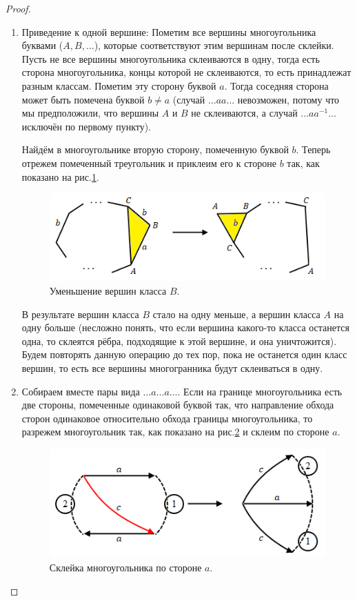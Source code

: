 \begin{proof}
\begin{enumerate}
        \item Приведение к одной вершине: 
        Пометим все вершины многоугольника буквами ($A,B, \dots$), которые соответствуют этим вершинам после склейки. Пусть не все вершины многоугольника склеиваются в одну, тогда есть сторона многоугольника, концы которой не склеиваются, то есть принадлежат разным классам. Пометим эту сторону буквой $a$. Тогда соседняя сторона может быть помечена буквой $b \neq a$ (случай $\dots aa \dots$ невозможен, потому что мы предположили, что вершины $A$ и $B$ не склеиваются, а случай $\dots aa^{-1} \dots$ исключён по первому пункту).

        Найдём в многоугольнике вторую сторону, помеченную буквой $b$. Теперь отрежем помеченный треугольник и приклеим его к стороне $b$ так, как показано на рис.\ref{fig:c10.5}.

        \begin{figure}[ht]
            \centering
            \includegraphics[scale=0.7]{images/c10.5.png}
            \caption{Уменьшение вершин класса $B$.}
            \label{fig:c10.5}
        \end{figure}

        В результате вершин класса $B$ стало на одну меньше, а вершин класса $A$ на одну больше (несложно понять, что если вершина какого-то класса останется одна, то склеятся рёбра, подходящие к этой вершине, и она уничтожится). Будем повторять данную операцию до тех пор, пока не останется один класс вершин, то есть все вершины многогранника будут склеиваться в одну.

        \item Собираем вместе пары вида $\dots a \dots a \dots$. Если на границе многоугольника есть две стороны, помеченные одинаковой буквой так, что направление обхода сторон одинаковое относительно обхода границы многоугольника, то разрежем многоугольник так, как показано на рис.\ref{fig:c10.6} и склеим по стороне $a$.
        
        \begin{figure}[ht]
            \centering
            \includegraphics[scale=0.7]{images/c10.6.png}
            \caption{Склейка многоугольника по стороне $a$.}
            \label{fig:c10.6}
        \end{figure}


\end{enumerate}
\end{proof}
